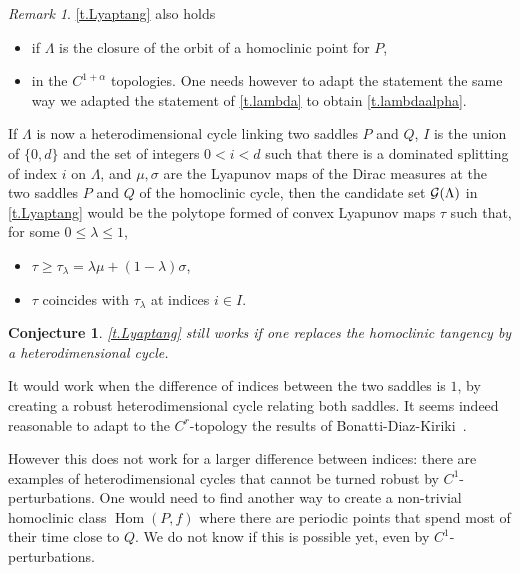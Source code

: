 \documentclass[11pt, a4paper]{amsart}
\theoremstyle{plain}
\newtheorem{conjecture}{Conjecture}[proposition]
\theoremstyle{definition}
\theoremstyle{remark}
\newtheorem{remark}[proposition]{Remark}
\numberwithin{equation}{section}         %
\def\Hom{\operatorname{Hom}}
\begin{document}

\begin{remark}
\cref{t.Lyaptang} also holds
\begin{itemize}
\item if $\Lambda$ is the closure of the orbit of a homoclinic point for $P$,
\item in the $C^{1+\alpha}$ topologies. One needs however to adapt the statement the same way we adapted the statement of \cref{t.lambda} to obtain \cref{t.lambdaalpha}.
\end{itemize}
\end{remark}



If $\Lambda$ is now a heterodimensional cycle linking two saddles $P$ and $Q$, $I$ is the union of $\{0,d\}$ and the set of integers $0< i< d$ such that there is a dominated splitting of index $i$ on $\Lambda$, and $\mu,\sigma$ are the Lyapunov maps of the Dirac measures at the two saddles $P$ and $Q$ of the homoclinic cycle, then the candidate set ${\mathcal G}(\Lambda)$ in \cref{t.Lyaptang} would be the polytope formed  of convex Lyapunov maps $\tau$ such that, for some $0\leq \lambda\leq 1$,
\begin{itemize}
\item $\tau\geq \tau_\lambda=\lambda\mu+(1-\lambda)\sigma$,
\item $\tau$ coincides with $\tau_\lambda$ at indices $i\in I$.
\end{itemize} 

\begin{conjecture}\label{t.Lyaphet}
\cref{t.Lyaptang} still works if one replaces the homoclinic tangency by a heterodimensional cycle.
\end{conjecture}

It would work when the difference of indices between the two saddles is $1$, by creating a robust heterodimensional cycle relating both saddles. It seems indeed reasonable to adapt to the $C^r$-topology the results of Bonatti-Diaz-Kiriki~\cite{BDK}. 

However this does not work for a larger difference between indices: there are examples of heterodimensional cycles that cannot be turned robust by $C^1$-perturbations. 
 One would need to find another way to create a non-trivial homoclinic class $\Hom(P,f)$ where there are periodic points that spend most of their time close to $Q$. We do not know if this is possible yet, even by $C^1$-perturbations.
 
\end{document}
